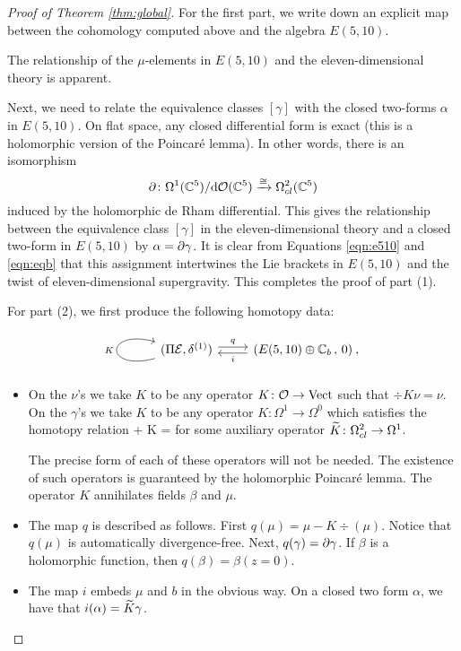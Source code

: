 \begin{proof}[Proof of Theorem \ref{thm:global}]
For the first part, we write down an explicit map between the cohomology computed above and the algebra $E(5,10)$. 

The relationship of the $\mu$-elements in $E(5,10)$ and the eleven-dimensional theory is apparent.

Next, we need to relate the equivalence classes $[\gamma]$ with the closed two-forms $\alpha$ in $E(5,10)$. 
On flat space, any closed differential form is exact (this is a holomorphic version of the Poincar\'e lemma). 
In other words, there is an isomorphism
\[
\partial \colon \Omega^1 (\mathbb C^5) / {\rm d} \mathcal O(\mathbb C^5) \xrightarrow{\cong} \Omega^{2}_{cl}(\mathbb C^5)
\]
induced by the holomorphic de Rham differential.
This gives the relationship between the equivalence class $[\gamma]$ in the eleven-dimensional theory and a closed two-form in $E(5,10)$ by $\alpha = \partial \gamma$. 
It is clear from Equations \eqref{eqn:e510} and \eqref{eqn:eqb} that this assignment intertwines the Lie brackets in $E(5,10)$ and the twist of eleven-dimensional supergravity. 
This completes the proof of part (1).

For part (2), we first produce the following homotopy data:
\begin{equation}
\begin{tikzcd}
\arrow[loop left]{l}{K}(\Pi \cE , \delta^{(1)})\arrow[r, shift left, "q"] &(E(5,10) \oplus \CC_b \, , \, 0)\arrow[l, shift left, "i"] \: ,
\end{tikzcd}
\end{equation}

\begin{itemize}
\item On the $\nu$'s we take $K$ to be any operator $K \colon \mathcal O \to {\rm Vect}$ such that $\div K \nu = \nu$. 
On the $\gamma$'s we take $K$ to be any operator $K \colon \Omega^1 \to \Omega^0$ which satisfies the homotopy relation
\beqn\label{eqn:htpy1}
 \del \gamma + \del K \gamma = \gamma
\eeqn
for some auxiliary operator $\widetilde{K} \colon \Omega^2_{cl} \to \Omega^1$.

The precise form of each of these operators will not be needed.
The existence of such operators is guaranteed by the holomorphic Poincar\'e lemma.
The operator $K$ annihilates fields $\beta$ and $\mu$. 
\item 
The map $q$ is described as follows. 
First $q(\mu) = \mu - K \div (\mu)$.
Notice that $q(\mu)$ is automatically divergence-free.
Next, $q(\gamma) = \partial \gamma$.
If $\beta$ is a holomorphic function, then $q(\beta) = \beta (z=0)$.
\item 
The map $i$ embeds $\mu$ and $b$ in the obvious way. On a closed two form $\alpha$, we have that $i(\alpha) = \widetilde{K}\gamma$.
\end{itemize}


\end{proof}
